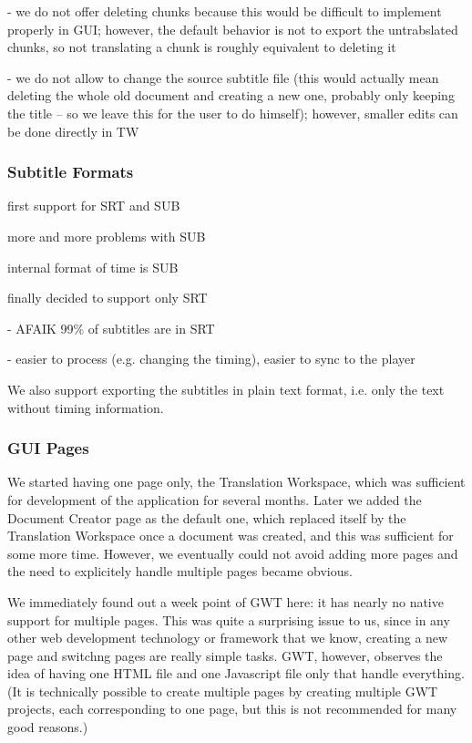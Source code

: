 - we do not offer deleting chunks because this would be difficult to implement properly in GUI; however, the default behavior is not to export the untrabslated chunks, so not translating a chunk is roughly equivalent to deleting it

- we do not allow to change the source subtitle file (this would actually mean deleting the whole old document and creating a new one, probably only keeping the title -- so we leave this for the user to do himself); however, smaller edits can be done directly in TW

\subsubsection{Subtitle Formats}

first support for SRT and SUB

more and more problems with SUB

internal format of time is SUB

finally decided to support only SRT

- AFAIK 99\% of subtitles are in SRT

- easier to process (e.g. changing the timing), easier to sync to the player

We also support exporting the subtitles in plain text format, i.e. only the text without timing information.

\subsubsection{GUI Pages}

We started having one page only, the Translation Workspace, which was sufficient for development of the application for several months. Later we added the Document  Creator page as the default one, which replaced itself by the Translation Workspace once a document was created, and this was sufficient for some more time. However, we eventually could not avoid adding more pages and the need to explicitely handle multiple pages became obvious.

We immediately found out a week point of GWT here: it has nearly no native support for multiple pages. This was quite a surprising issue to us, since in any other web development technology or framework that we know, creating a new page and switchng pages are really simple tasks. GWT, however, observes the idea of having one HTML file and one Javascript file only that handle everything. (It is technically possible to create multiple pages by creating multiple GWT projects, each corresponding to one page, but this is not recommended for many good reasons.)

